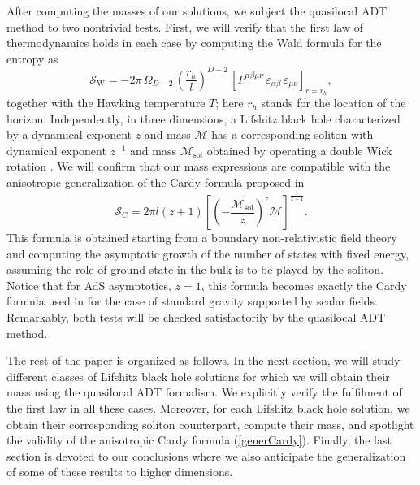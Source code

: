 \documentclass[prd,twocolumn,superscriptaddress,amsmath,amssymb,nofootinbib]{revtex4-1}
\begin{document}
After computing the masses of our solutions, we subject the
quasilocal ADT method to two nontrivial tests. First, we will
verify that the first law of thermodynamics holds in each case
by computing the Wald formula \cite{Wald:1993nt} for the
entropy as
\begin{equation}
\mathcal{S}_{\mathrm{W}}=-2\pi\,\Omega_{D-2}\,
\left(\frac{r_{h}}{l}\right)^{D-2}\,
\left[P^{\alpha\beta\mu\nu}\,\varepsilon_{\alpha\beta}\,
\varepsilon_{\mu\nu}\right]_{r=r_{h}},
\label{w2}
\end{equation}
together with the Hawking temperature $T$; here $r_h$ stands
for the location of the horizon. Independently, in three
dimensions, a Lifshitz black hole characterized by a dynamical
exponent $z$ and mass $\mathcal{M}$ has a corresponding soliton
with dynamical exponent $z^{-1}$ and mass
$\mathcal{M}_{\mathrm{sol}}$ obtained by operating a double
Wick rotation \cite{Gonzalez:2011nz}. We will confirm that our
mass expressions are compatible with the anisotropic
generalization of the Cardy formula proposed in
\cite{Gonzalez:2011nz}
\begin{equation}\label{generCardy}
\mathcal{S}_{\mathrm{C}}=2\pi{l}(z+1)\left[
\left(-\frac{\mathcal{M}_{\mathrm{sol}}}{z}\right)^{z}\mathcal{M}\right]
^{\frac{1}{z+1}}.
\end{equation}
This formula is obtained starting from a boundary
non-relativistic field theory and computing the asymptotic
growth of the number of states with fixed energy, assuming the
role of ground state in the bulk is to be played by the
soliton. Notice that for AdS asymptotics, $z=1$, this formula
becomes exactly the Cardy formula used in \cite{Correa:2010hf}
for the case of standard gravity supported by scalar fields.
Remarkably, both tests will be checked satisfactorily by the
quasilocal ADT method.

The rest of the paper is organized as follows. In the next
section, we will study different classes of Lifshitz black hole
solutions for which we will obtain their mass using the
quasilocal ADT formalism. We explicitly verify the fulfilment
of the first law in all these cases.  Moreover, for each
Lifshitz black hole solution, we obtain their corresponding
soliton counterpart, compute their mass, and spotlight the
validity of the anisotropic Cardy formula (\ref{generCardy}).
Finally, the last section is devoted to our conclusions where
we also anticipate the generalization of some of these results
to higher dimensions.

\end{document}
